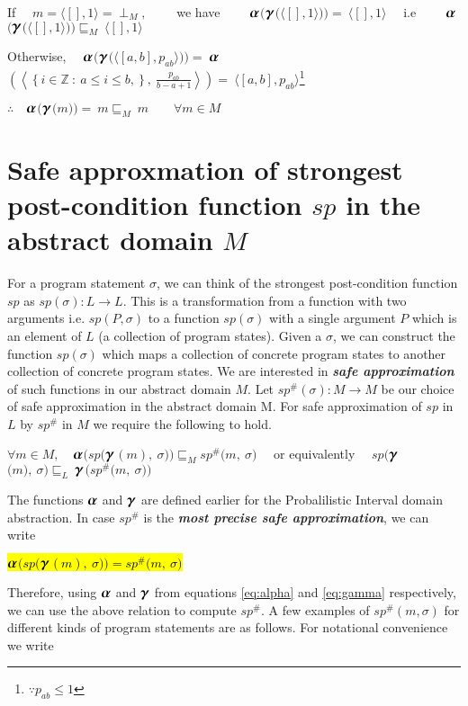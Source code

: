 \documentclass[final,3p, review, times]{util/elsarticle}
\newcommand{\ALPHA}{\large\boldsymbol{\alpha}\normalsize}
\newcommand{\GAMMA}{\large\boldsymbol{\gamma}\normalsize}
\begin{document}
If $\quad m=\langle[],1\rangle=\perp_M,\qquad$ we have $\qquad$$\ALPHA$$\Big($$\GAMMA$$\big(\langle[],1\rangle\big)\Big)=\ \langle[],1\rangle\quad$ i.e $\qquad$$\ALPHA$$\Big($$\GAMMA$$\big(\langle[],1\rangle\big)\Big)\sqsubseteq_M\ \langle[],1\rangle\quad$

Otherwise, $\quad$$\ALPHA$$\bigg($$\GAMMA$$\Big(\langle [a,b],p_{ab}\rangle\Big)\bigg) =\ $$\ALPHA$$\left(\left\langle\left\{i\in\mathbb{Z}\ :\ a\leq i\leq b,\right\},\ \displaystyle\frac{p_{ab}}{b-a+1}\right\rangle\right)=\ \langle[a,b],p_{ab}\rangle$\footnote{$\because p_{ab}\leq 1$}

$\therefore\quad$$\ALPHA$$\Big($$\GAMMA$$\big(m\big)\Big) =\ m\sqsubseteq_M\ m\qquad\forall m\in M$

\section{Safe approxmation of strongest post-condition function $sp$ in the abstract domain $M$}

For a program statement $\sigma$, we can think of the strongest post-condition function $sp$ as $sp(\sigma) : L\to L$. This is a transformation from a function with two arguments i.e. $sp(P,\sigma)$ to a function $sp(\sigma)$ with a single argument $P$ which is an element of $L$ (a collection of program states). Given a $\sigma$, we can construct the function $sp(\sigma)$ which maps a collection of concrete program states to another collection of concrete program states. We are interested in \textbf{\textit{safe approximation}} of such functions in our abstract domain $M$. Let $sp^\#(\sigma) : M\to M$ be our choice of safe approximation in the abstract domain M. For safe approximation of $sp$ in $L$ by $sp^\#$ in $M$ we require the following to hold.

\centerline{
$\forall m\in M,\quad$$\ALPHA$$\Big(sp\big($$\GAMMA$$(m),\ \sigma\big)\Big)\sqsubseteq_M sp^\#\big(m,\ \sigma\big)\quad$ or equivalently $\quad sp\Big($$\GAMMA$$\big(m\big),\ \sigma\Big)\sqsubseteq_L\ $$\GAMMA$$\Big(sp^\#\big(m,\ \sigma\big)\Big)$
}

The functions $\ALPHA$ and $\GAMMA$ are defined earlier for the Probalilistic Interval domain abstraction. In case $sp^\#$ is the \textbf{\textit{most precise safe approximation}}, we can write

\centerline{
\hl{$\ALPHA$$\Big(sp\big($$\GAMMA$$(m),\ \sigma\big)\Big)=sp^\#\big(m,\ \sigma\big)$}
}
Therefore, using $\ALPHA$ and $\GAMMA$ from equations \ref{eq:alpha} and \ref{eq:gamma} respectively, we can use the above relation to compute $sp^\#$. A few examples of $sp^\#(m,\sigma)$ for different kinds of program statements are as follows. For notational convenience we write
\end{document}
